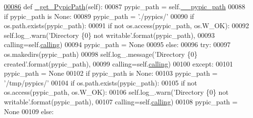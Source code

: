 \begin{DoxyCode}
\hypertarget{classpyneb_1_1utils_1_1_config_1_1___config_l00086}{}\hyperlink{classpyneb_1_1utils_1_1_config_1_1___config_a949b65b35f3bf0e60390e28460818aba}{00086}     \textcolor{keyword}{def }\hyperlink{classpyneb_1_1utils_1_1_config_1_1___config_a949b65b35f3bf0e60390e28460818aba}{\_get\_PypicPath}(self):
00087         pypic\_path = self.\hyperlink{classpyneb_1_1utils_1_1_config_1_1___config_a1c122165aa8885ce11f9bf86d08c40cd}{\_\_pypic\_path}
00088         \textcolor{keywordflow}{if} pypic\_path \textcolor{keywordflow}{is} \textcolor{keywordtype}{None}:
00089             pypic\_path = \textcolor{stringliteral}{'./pypics/'}
00090             \textcolor{keywordflow}{if} os.path.exists(pypic\_path):
00091                 \textcolor{keywordflow}{if} \textcolor{keywordflow}{not} os.access(pypic\_path, os.W\_OK):
00092                     self.log\_.warn(\textcolor{stringliteral}{'Directory \{0\} not writable'}.format(pypic\_path),
00093                                       calling=self.\hyperlink{classpyneb_1_1utils_1_1_config_1_1___config_abf04542e5670abea107260ca7a6baf6d}{calling})
00094                     pypic\_path = \textcolor{keywordtype}{None}
00095             \textcolor{keywordflow}{else}:
00096                 \textcolor{keywordflow}{try}:
00097                     os.makedirs(pypic\_path)
00098                     self.log\_.message(\textcolor{stringliteral}{'Directory \{0\} created'}.format(pypic\_path),
00099                                       calling=self.\hyperlink{classpyneb_1_1utils_1_1_config_1_1___config_abf04542e5670abea107260ca7a6baf6d}{calling})
00100                 \textcolor{keywordflow}{except}:
00101                     pypic\_path = \textcolor{keywordtype}{None}
00102             \textcolor{keywordflow}{if} pypic\_path \textcolor{keywordflow}{is} \textcolor{keywordtype}{None}:
00103                 pypic\_path = \textcolor{stringliteral}{'/tmp/pypics/'}
00104                 \textcolor{keywordflow}{if} os.path.exists(pypic\_path):
00105                     \textcolor{keywordflow}{if} \textcolor{keywordflow}{not} os.access(pypic\_path, os.W\_OK):
00106                         self.log\_.warn(\textcolor{stringliteral}{'Directory \{0\} not writable'}.format(pypic\_path),
00107                                           calling=self.\hyperlink{classpyneb_1_1utils_1_1_config_1_1___config_abf04542e5670abea107260ca7a6baf6d}{calling})                                   
00108                         pypic\_path = \textcolor{keywordtype}{None} 
00109                 \textcolor{keywordflow}{else}:

\end{DoxyCode}
